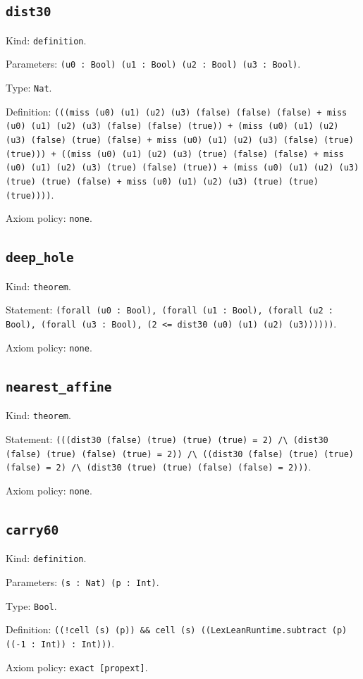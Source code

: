 \documentclass[11pt]{article}
\begin{document}
\subsection*{\texttt{dist30}}
\noindent Kind: \texttt{definition}.\par
\noindent Parameters: \texttt{(u0 : Bool) (u1 : Bool) (u2 : Bool) (u3 : Bool)}.\par
\noindent Type: \texttt{Nat}.\par
\noindent Definition: \texttt{(((miss (u0) (u1) (u2) (u3) (false) (false) (false) + miss (u0) (u1) (u2) (u3) (false) (false) (true)) + (miss (u0) (u1) (u2) (u3) (false) (true) (false) + miss (u0) (u1) (u2) (u3) (false) (true) (true))) + ((miss (u0) (u1) (u2) (u3) (true) (false) (false) + miss (u0) (u1) (u2) (u3) (true) (false) (true)) + (miss (u0) (u1) (u2) (u3) (true) (true) (false) + miss (u0) (u1) (u2) (u3) (true) (true) (true))))}.\par
\noindent Axiom policy: \texttt{none}.\par
\subsection*{\texttt{deep\_hole}}
\noindent Kind: \texttt{theorem}.\par
\noindent Statement: \texttt{(forall (u0 : Bool), (forall (u1 : Bool), (forall (u2 : Bool), (forall (u3 : Bool), (2 <= dist30 (u0) (u1) (u2) (u3))))))}.\par
\noindent Axiom policy: \texttt{none}.\par
\subsection*{\texttt{nearest\_affine}}
\noindent Kind: \texttt{theorem}.\par
\noindent Statement: \texttt{(((dist30 (false) (true) (true) (true) = 2) /\textbackslash{} (dist30 (false) (true) (false) (true) = 2)) /\textbackslash{} ((dist30 (false) (true) (true) (false) = 2) /\textbackslash{} (dist30 (true) (true) (false) (false) = 2)))}.\par
\noindent Axiom policy: \texttt{none}.\par
\subsection*{\texttt{carry60}}
\noindent Kind: \texttt{definition}.\par
\noindent Parameters: \texttt{(s : Nat) (p : Int)}.\par
\noindent Type: \texttt{Bool}.\par
\noindent Definition: \texttt{((!cell (s) (p)) \&\& cell (s) ((LexLeanRuntime.subtract (p) ((-1 : Int)) : Int)))}.\par
\noindent Axiom policy: \texttt{exact [propext]}.\par
\end{document}
